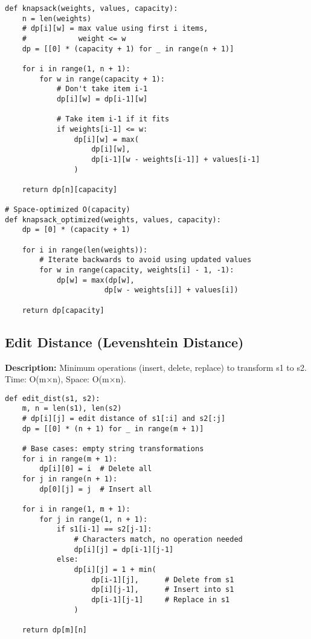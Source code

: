 \begin{lstlisting}
def knapsack(weights, values, capacity):
    n = len(weights)
    # dp[i][w] = max value using first i items, 
    #            weight <= w
    dp = [[0] * (capacity + 1) for _ in range(n + 1)]
    
    for i in range(1, n + 1):
        for w in range(capacity + 1):
            # Don't take item i-1
            dp[i][w] = dp[i-1][w]
            
            # Take item i-1 if it fits
            if weights[i-1] <= w:
                dp[i][w] = max(
                    dp[i][w],
                    dp[i-1][w - weights[i-1]] + values[i-1]
                )
    
    return dp[n][capacity]

# Space-optimized O(capacity)
def knapsack_optimized(weights, values, capacity):
    dp = [0] * (capacity + 1)
    
    for i in range(len(weights)):
        # Iterate backwards to avoid using updated values
        for w in range(capacity, weights[i] - 1, -1):
            dp[w] = max(dp[w], 
                       dp[w - weights[i]] + values[i])
    
    return dp[capacity]
\end{lstlisting}

\subsection{Edit Distance (Levenshtein Distance)}
\textbf{Description:} Minimum operations (insert, delete, replace) to transform s1 to s2. Time: O(m×n), Space: O(m×n).

\begin{lstlisting}
def edit_dist(s1, s2):
    m, n = len(s1), len(s2)
    # dp[i][j] = edit distance of s1[:i] and s2[:j]
    dp = [[0] * (n + 1) for _ in range(m + 1)]
    
    # Base cases: empty string transformations
    for i in range(m + 1):
        dp[i][0] = i  # Delete all
    for j in range(n + 1):
        dp[0][j] = j  # Insert all
    
    for i in range(1, m + 1):
        for j in range(1, n + 1):
            if s1[i-1] == s2[j-1]:
                # Characters match, no operation needed
                dp[i][j] = dp[i-1][j-1]
            else:
                dp[i][j] = 1 + min(
                    dp[i-1][j],      # Delete from s1
                    dp[i][j-1],      # Insert into s1
                    dp[i-1][j-1]     # Replace in s1
                )
    
    return dp[m][n]
\end{lstlisting}
